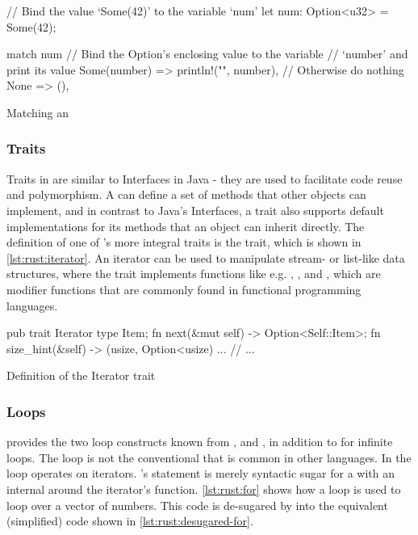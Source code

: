 \begin{listing}[H]
  \begin{rustcode}
// Bind the value `Some(42)' to the variable `num'
let num: Option<u32> = Some(42);

match num {
  // Bind the Option's enclosing value to the variable
  // `number' and print its value
  Some(number) => println!("{}", number),
  // Otherwise do nothing
  None => (),
}
  \end{rustcode}
  \caption{Matching an }
  \label{lst:rust:match}
\end{listing}

\subsubsection{Traits}

Traits in {\rust} are similar to Interfaces in Java - they are used to facilitate code reuse and polymorphism.
A  can define a set of methods that other objects can implement, and in contrast to Java's Interfaces, a trait also supports default implementations for its methods that an object can inherit directly.
The definition of one of {\rust}'s more integral traits is the  trait, which is shown in \autoref{lst:rust:iterator}.
An iterator can be used to manipulate stream- or list-like data structures, where the trait implements functions like e.g. , , and , which are modifier functions that are commonly found in functional programming languages.

\begin{listing}[H]
  \begin{rustcode}
pub trait Iterator {
  type Item;
  fn next(&mut self) -> Option<Self::Item>;
  fn size_hint(&self) -> (usize, Option<usize) { ... }
  // ...
}
  \end{rustcode}
  \caption{Definition of the Iterator trait}
  \label{lst:rust:iterator}
\end{listing}

\subsubsection{Loops}
\label{sec:rust:loops}

{\rust} provides the two loop constructs known from {\C},  and , in addition to  for infinite loops.
The  loop is not the conventional  that is common in other languages.
In {\rust} the  loop operates on iterators.
\rust's  statement is merely syntactic sugar for a  with an internal  around the iterator's  function.
\autoref{lst:rust:for} shows how a  loop is used to loop over a vector of numbers.
This code is de-sugared by {\rust} into the equivalent (simplified) code shown in \autoref{lst:rust:desugared-for}.

